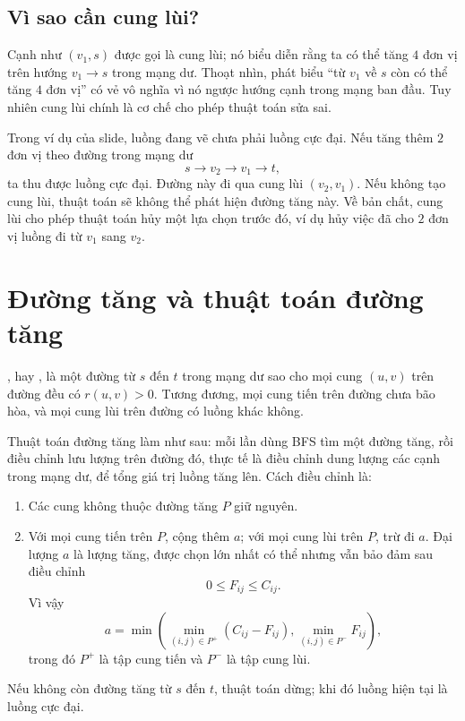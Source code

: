 \documentclass[11pt]{article}
\begin{document}
\subsection{Vì sao cần cung lùi?}

Cạnh như $(v_1,s)$ được gọi là cung lùi; nó biểu diễn rằng ta có thể tăng
$4$ đơn vị trên hướng $v_1\to s$ trong mạng dư. Thoạt nhìn, phát biểu ``từ
$v_1$ về $s$ còn có thể tăng $4$ đơn vị'' có vẻ vô nghĩa vì nó ngược hướng
cạnh trong mạng ban đầu. Tuy nhiên cung lùi chính là cơ chế cho phép thuật
toán sửa sai.

Trong ví dụ của slide, luồng đang vẽ chưa phải luồng cực đại. Nếu tăng thêm
$2$ đơn vị theo đường trong mạng dư
\[
  s\to v_2\to v_1\to t,
\]
ta thu được luồng cực đại. Đường này đi qua cung lùi $(v_2,v_1)$. Nếu không
tạo cung lùi, thuật toán sẽ không thể phát hiện đường tăng này. Về bản chất,
cung lùi cho phép thuật toán hủy một lựa chọn trước đó, ví dụ hủy việc đã cho
$2$ đơn vị luồng đi từ $v_1$ sang $v_2$.

\section{Đường tăng và thuật toán đường tăng}

, hay , là một đường từ $s$ đến $t$ trong
mạng dư sao cho mọi cung $(u,v)$ trên đường đều có $r(u,v)>0$. Tương đương,
mọi cung tiến trên đường chưa bão hòa, và mọi cung lùi trên đường có luồng
khác không.

Thuật toán đường tăng làm như sau: mỗi lần dùng BFS tìm một đường tăng, rồi
điều chỉnh lưu lượng trên đường đó, thực tế là điều chỉnh dung lượng các cạnh
trong mạng dư, để tổng giá trị luồng tăng lên. Cách điều chỉnh là:

\begin{enumerate}
  \item Các cung không thuộc đường tăng $P$ giữ nguyên.
  \item Với mọi cung tiến trên $P$, cộng thêm $a$; với mọi cung lùi trên $P$,
  trừ đi $a$. Đại lượng $a$ là lượng tăng, được chọn lớn nhất có thể nhưng vẫn
  bảo đảm sau điều chỉnh
  \[
    0\le F_{ij}\le C_{ij}.
  \]
  Vì vậy
  \[
    a=\min\left(
      \min_{(i,j)\in P^+}(C_{ij}-F_{ij}),
      \min_{(i,j)\in P^-}F_{ij}
    \right),
  \]
  trong đó $P^+$ là tập cung tiến và $P^-$ là tập cung lùi.
\end{enumerate}

Nếu không còn đường tăng từ $s$ đến $t$, thuật toán dừng; khi đó luồng hiện
tại là luồng cực đại.
\end{document}
